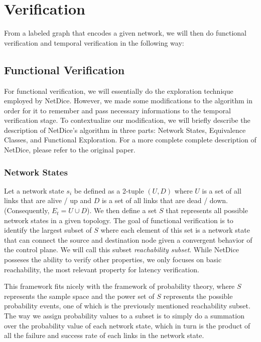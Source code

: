 \documentclass[10pt,sigconf,letterpaper,anonymous,nonacm]{acmart}
\begin{document}
\section{Verification} \label{verification}
From a labeled graph that encodes a given network, we will then do functional verification 
and temporal verification in the following way:

\subsection{Functional Verification}
For functional verification, we will essentially do the exploration technique employed by NetDice.
However, we made some modifications to the algorithm in order for it to remember and pass 
necessary informations to the temporal verification stage.
To contextualize our modification, we will briefly describe the description of NetDice's algorithm 
in three parts: Network States, Equivalence Classes, and Functional Exploration.
For a more complete complete description of NetDice, please refer to the original paper.

\subsubsection{Network States}
Let a network state $s_i$ be defined as a 2-tuple $(U, D)$ where $U$ is a set of all links that 
are alive / up and $D$ is a set of all links that are dead / down.
(Consequently, $E_t = U \cup D$).
We then define a set $S$ that represents all possible network states in a given topology. 
The goal of functional verification is to identify the largest subset of $S$ where each element 
of this set is a network state that can connect the source and destination node given a convergent 
behavior of the control plane.
We will call this subset \textit{reachability subset}.
While NetDice posseses the ability to verify other properties, we only focuses on basic 
reachability, the most relevant property for latency verification.

This framework fits nicely with the framework of probability theory, where $S$ represents the 
sample space and the power set of $S$ represents the possible probability events, one of which is 
the previously mentioned reachability subset.
The way we assign probability values to a subset is to simply do a summation over the probability 
value of each network state, which in turn is the product of all the failure and success rate of 
each links in the network state.
\end{document}
